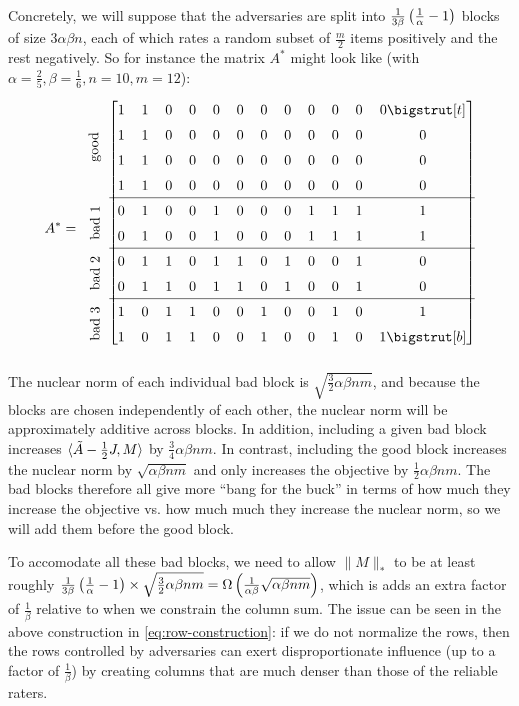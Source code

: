 Concretely, we will suppose that the adversaries are split into 
$\frac{1}{3\beta}\left( \frac{1}{\alpha}-1 \right)$ blocks of size $3\alpha\beta n$, 
each of which rates a random subset of 
$\frac{m}{2}$ items positively and the rest negatively. So for instance 
the matrix $A^*$ might look like (with $\alpha=\frac{2}{5}, \beta=\frac{1}{6}, n=10, m=12$):
\newcommand\topstrut[1][1.2ex]{\setlength\bigstrutjot{#1}{\bigstrut[t]}}
\newcommand\botstrut[1][0.9ex]{\setlength\bigstrutjot{#1}{\bigstrut[b]}}
\begin{equation}
\label{eq:row-construction}
\def\arraystretch{1.5}
A^* = \begin{blockarray}{c[cccccccccccc]}
\multirow{4}{*}{\rotatebox[origin=c]{90}{\textrm{good}}} 
 & 1 & 1 & 0 & 0 & 0 & 0 & 0 & 0 & 0 & 0 & 0 & 0 \topstrut \\
&  1 & 1 & 0 & 0 & 0 & 0 & 0 & 0 & 0 & 0 & 0 & 0 \\
&  1 & 1 & 0 & 0 & 0 & 0 & 0 & 0 & 0 & 0 & 0 & 0 \\
&  1 & 1 & 0 & 0 & 0 & 0 & 0 & 0 & 0 & 0 & 0 & 0 \\
\cline{2-13}
\multirow{2}{*}{\rotatebox[origin=c]{90}{\textrm{bad $1$}}}
 & 0 & 1 & 0 & 0 & 1 & 0 & 0 & 0 & 1 & 1 & 1 & 1 \\
&  0 & 1 & 0 & 0 & 1 & 0 & 0 & 0 & 1 & 1 & 1 & 1 \\
\cline{2-13}
\multirow{2}{*}{\rotatebox[origin=c]{90}{\textrm{bad $2$}}}
 & 0 & 1 & 1 & 0 & 1 & 1 & 0 & 1 & 0 & 0 & 1 & 0 \\
&  0 & 1 & 1 & 0 & 1 & 1 & 0 & 1 & 0 & 0 & 1 & 0 \\
\cline{2-13}
\multirow{2}{*}{\rotatebox[origin=c]{90}{\textrm{bad $3$}}}
 & 1 & 0 & 1 & 1 & 0 & 0 & 1 & 0 & 0 & 1 & 0 & 1 \\
&  1 & 0 & 1 & 1 & 0 & 0 & 1 & 0 & 0 & 1 & 0 & 1 \botstrut \\
\end{blockarray}
\end{equation}
The nuclear norm of each individual bad block is 
$\sqrt{\frac{3}{2}\alpha\beta nm}$, and because the blocks are 
chosen independently of each other, the nuclear norm will be approximately 
additive across blocks. In addition, including a given bad block 
increases $\langle \tilde{A} - \frac{1}{2}J, M \rangle$ by $\frac{3}{4}\alpha\beta nm$.
In contrast, including the good block increases the nuclear norm by 
$\sqrt{\alpha\beta nm}$ and only increases the objective by $\frac{1}{2}\alpha\beta nm$. The bad blocks therefore all give more ``bang for the buck'' in terms of 
how much they increase the objective vs. how much much they increase the nuclear 
norm, so we will add them before the good block.

To accomodate all these bad 
blocks, we need to allow $\|M\|_*$ to be at least roughly 
$\frac{1}{3\beta}\left( \frac{1}{\alpha}-1 \right) \times \sqrt{\frac{3}{2}\alpha\beta nm} 
= \Omega\left( \frac{1}{\alpha\beta}\sqrt{\alpha\beta nm} \right)$, which is adds an extra 
factor of $\frac{1}{\beta}$ relative to when we constrain the column sum. 
The issue can be seen in the above construction in \eqref{eq:row-construction}: 
if we do not normalize the rows, then the rows controlled by adversaries can 
exert disproportionate influence (up to a factor of $\frac{1}{\beta}$) by 
creating columns that are much denser than those of the reliable raters.
